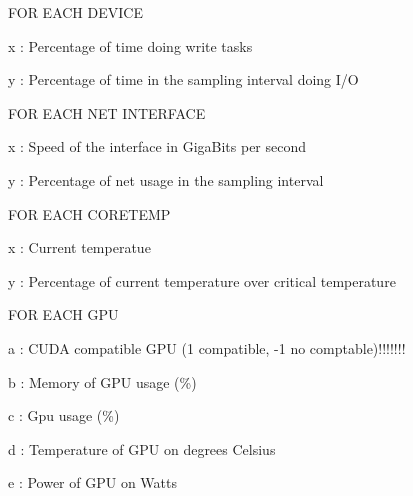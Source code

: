 \begin{DoxyItemize}
\begin{DoxyItemize}
\begin{DoxyItemize}
\end{DoxyItemize}
\item F\+OR E\+A\+CH D\+E\+V\+I\+CE
\begin{DoxyItemize}
\item x \+: Percentage of time doing write tasks
\item y \+: Percentage of time in the sampling interval doing I/O
\end{DoxyItemize}
\item F\+OR E\+A\+CH N\+ET I\+N\+T\+E\+R\+F\+A\+CE
\begin{DoxyItemize}
\item x \+: Speed of the interface in Giga\+Bits per second
\item y \+: Percentage of net usage in the sampling interval
\end{DoxyItemize}
\item F\+OR E\+A\+CH C\+O\+R\+E\+T\+E\+MP
\begin{DoxyItemize}
\item x \+: Current temperatue
\item y \+: Percentage of current temperature over critical temperature
\end{DoxyItemize}
\item F\+OR E\+A\+CH G\+PU
\begin{DoxyItemize}
\item a \+: C\+U\+DA compatible G\+PU (1 compatible, -\/1 no comptable)!!!!!!!
\item b \+: Memory of G\+PU usage (\%)
\item c \+: Gpu usage (\%)
\item d \+: Temperature of G\+PU on degrees Celsius
\item e \+: Power of G\+PU on Watts 
\end{DoxyItemize}
\end{DoxyItemize}
\end{DoxyItemize}